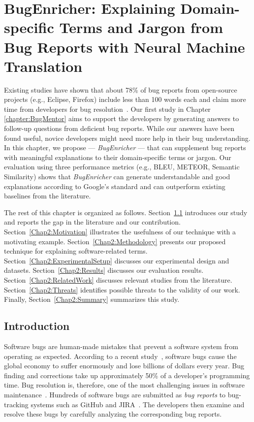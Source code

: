 \chapter{BugEnricher: Explaining Domain-specific Terms and Jargon from Bug Reports with Neural Machine Translation} \label{Chap2:BugEnricher}

Existing studies have shown that about 78\% of bug reports from open-source projects (e.g., Eclipse, Firefox) include less than 100 words each and claim more time from developers for bug resolution~\cite{zhang2017bug}. Our first study in Chapter \ref{chapter:BugMentor} aims to support the developers by generating answers to follow-up questions from deficient bug reports. While our answers have been found useful, novice developers might need more help in their bug understanding. In this chapter, we propose --- \textit{BugEnricher} --- that can supplement bug reports with meaningful explanations to their domain-specific terms or jargon. Our evaluation using three performance metrics (e.g., BLEU, METEOR, Semantic Similarity) shows that \textit{BugEnricher} can generate understandable and good explanations according to Google’s standard and can outperform existing baselines from the literature. \par

The rest of this chapter is organized as follows. Section~\ref{Chap2:Intro} introduces our study and reports the gap in the literature and our contribution. Section~\ref{Chap2:Motivation} illustrates the usefulness of our technique with a motivating example. Section~\ref{Chap2:Methodology} presents our proposed technique for explaining software-related terms. Section~\ref{Chap2:ExperimentalSetup} discusses our experimental design and datasets.
Section~\ref{Chap2:Results} discusses our evaluation results. Section~\ref{Chap2:RelatedWork} discusses relevant studies from the literature. Section~\ref{Chap2:Threats} identifies possible threats to the validity of our work. Finally, Section~\ref{Chap2:Summary} summarizes this study.


\section{Introduction} \label{Chap2:Intro}

Software bugs are human-made mistakes that prevent a software system from operating as expected.
According to a recent study~\cite{britton2013reversible, zou2018practitioners}, software bugs cause the global economy to suffer enormously and lose billions of dollars every year. Bug finding and corrections take up approximately 50\% of a developer's programming time. Bug resolution is, therefore, one of the most challenging issues in software maintenance~\cite{zou2018practitioners}. Hundreds of software bugs are submitted as \textit{bug reports} to bug-tracking systems such as GitHub and JIRA~\cite{anvik2006should}. The developers then examine and resolve these bugs by carefully analyzing the corresponding bug reports.

